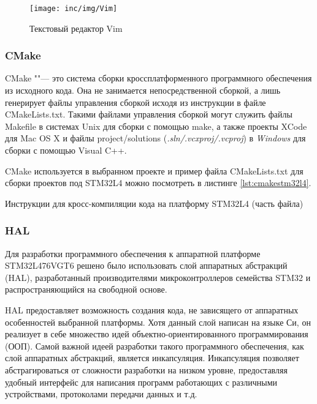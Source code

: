 \begin{figure}[!h]
  \centering
  \texttt{[image: inc/img/Vim]}
  \caption{Текстовый редактор Vim}
  \label{fig:ideeclipse}
\end{figure}


\subsubsection{CMake}

CMake ""--- это система сборки кроссплатформенного программного обеспечения из 
исходного кода. 
Она не занимается непосредственной сборкой, а лишь генерирует файлы управления 
сборкой исходя из инструкции в файле CMakeLists.txt.
Такими файлами управления сборкой могут служить файлы Makefile в системах Unix 
для сборки с помощью make, а также проекты XCode для Mac OS X и файлы 
project/solutions (\textit{.sln/.vcxproj/.vcproj}) в \textit{Windows} для 
сборки с помощью Visual C++.

CMake используется в выбранном проекте и пример файла CMakeLists.txt для сборки 
проектов под STM32L4 можно посмотреть в листинге \ref{lst:cmakestm32l4}.

\begin{listing}[H]
\caption{Инструкции для кросс-компиляции кода на платформу STM32L4 (часть 
файла)} 
\label{lst:cmakestm32l4}
\end{listing}

\subsubsection{HAL}

Для разработки программного обеспечения к аппаратной платформе STM32L476VGT6 
решено было использовать слой аппаратных абстракций (HAL), разработанный 
производителями микроконтроллеров семейства STM32 и распространяющийся на 
свободной основе.

HAL предоставляет возможность создания кода, не зависящего от аппаратных 
особенностей выбранной платформы. 
Хотя данный слой написан на языке Си, он реализует в себе множество идей 
объектно-ориентированного программирования (ООП). 
Самой важной идеей разработки такого программного обеспечения, как слой 
аппаратных абстракций, является инкапсуляция.
Инкапсуляция позволяет абстрагироваться от сложности разработки на низком 
уровне, предоставляя удобный интерфейс для написания программ работающих с 
различными устройствами, протоколами передачи данных и т.д.

